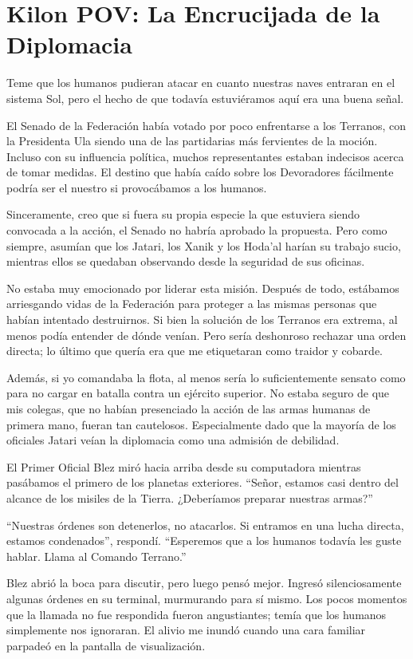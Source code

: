 \chapter{Kilon POV: La Encrucijada de la Diplomacia}

Teme que los humanos pudieran atacar en cuanto nuestras naves entraran en el sistema Sol, pero el hecho de que todavía estuviéramos aquí era una buena señal.

El Senado de la Federación había votado por poco enfrentarse a los Terranos, con la Presidenta Ula siendo una de las partidarias más fervientes de la moción. Incluso con su influencia política, muchos representantes estaban indecisos acerca de tomar medidas. El destino que había caído sobre los Devoradores fácilmente podría ser el nuestro si provocábamos a los humanos.

Sinceramente, creo que si fuera su propia especie la que estuviera siendo convocada a la acción, el Senado no habría aprobado la propuesta. Pero como siempre, asumían que los Jatari, los Xanik y los Hoda’al harían su trabajo sucio, mientras ellos se quedaban observando desde la seguridad de sus oficinas.

No estaba muy emocionado por liderar esta misión. Después de todo, estábamos arriesgando vidas de la Federación para proteger a las mismas personas que habían intentado destruirnos. Si bien la solución de los Terranos era extrema, al menos podía entender de dónde venían. Pero sería deshonroso rechazar una orden directa; lo último que quería era que me etiquetaran como traidor y cobarde.

Además, si yo comandaba la flota, al menos sería lo suficientemente sensato como para no cargar en batalla contra un ejército superior. No estaba seguro de que mis colegas, que no habían presenciado la acción de las armas humanas de primera mano, fueran tan cautelosos. Especialmente dado que la mayoría de los oficiales Jatari veían la diplomacia como una admisión de debilidad.

El Primer Oficial Blez miró hacia arriba desde su computadora mientras pasábamos el primero de los planetas exteriores. “Señor, estamos casi dentro del alcance de los misiles de la Tierra. ¿Deberíamos preparar nuestras armas?”

“Nuestras órdenes son detenerlos, no atacarlos. Si entramos en una lucha directa, estamos condenados”, respondí. “Esperemos que a los humanos todavía les guste hablar. Llama al Comando Terrano.”

Blez abrió la boca para discutir, pero luego pensó mejor. Ingresó silenciosamente algunas órdenes en su terminal, murmurando para sí mismo. Los pocos momentos que la llamada no fue respondida fueron angustiantes; temía que los humanos simplemente nos ignoraran. El alivio me inundó cuando una cara familiar parpadeó en la pantalla de visualización.

